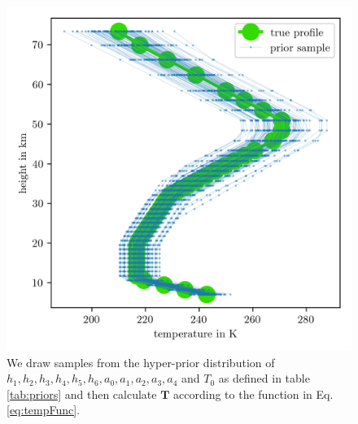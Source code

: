 \begin{figure}[ht!]
	\centering
	\includegraphics{PriorTempPostMeanSigm.png}
	\caption[Prior Samples of $\bm{T}$ according to the respective hyper-prior distribution.]{We draw samples from the hyper-prior distribution of $h_1, h_2,h_3,h_4,h_5,h_6, a_0, a_1, a_2,a_3,a_4$ and $T_0$ as defined in table \ref{tab:priors} and then calculate $\bm{T}$ according to the function in Eq. \ref{eq:tempFunc}.}
	\label{fig:PriorTemp}
\end{figure}

